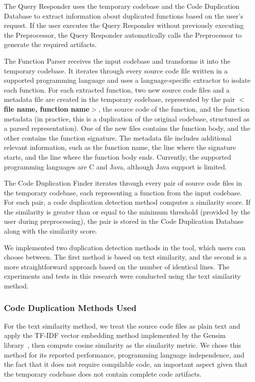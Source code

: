 \documentclass[conference]{IEEEtran}
\begin{document}
The Query Responder uses the temporary codebase and the Code Duplication Database to extract 
information about duplicated functions based on the user's request. If the user executes the Query Responder
without previously executing the Preprocessor, the Query Responder automatically 
calls the Preprocessor to generate the required artifacts.

The Function Parser receives the input codebase and transforms it into the temporary
codebase. It iterates through every source code file written in a supported programming 
language and uses a language-specific extractor to isolate each function. For each extracted 
function, two new source code files and a metadata file are created in the temporary codebase, 
represented by the pair \textbf{$<$file name, function name$>$}, the source code of the function, 
and the function metadata (in practice, this is a duplication of the original codebase, 
structured as a parsed representation). One of the new files contains the function body, and the other 
contains the function signature. The metadata file includes additional relevant information,
such as the function name, the line where the signature starts, and the line where the function 
body ends. Currently, the supported programming languages are C and Java, although Java support is limited.

The Code Duplication Finder iterates through every pair of source code files in the
temporary codebase, each representing a function from the input codebase. For each pair,
a code duplication detection method computes a similarity score. If the similarity is greater 
than or equal to the minimum threshold (provided by the user during preprocessing), the pair 
is stored in the Code Duplication Database along with the similarity score.

We implemented two duplication detection methods in the tool, which users can choose 
between. The first method is based on text similarity, and the second is a more straightforward approach 
based on the number of identical lines. The experiments and tests in this research were 
conducted using the text similarity method.


\subsubsection{Code Duplication Methods Used}

For the text similarity method, we treat the source code files as plain text and apply the
TF-IDF vector embedding method implemented by the Gensim library~\cite{gensim},
then compute cosine similarity as the similarity metric. We chose this method for 
its reported performance, programming language independence, and the fact that it does 
not require compilable code, an important aspect given that the
temporary codebase does not contain complete code artifacts.
\end{document}

